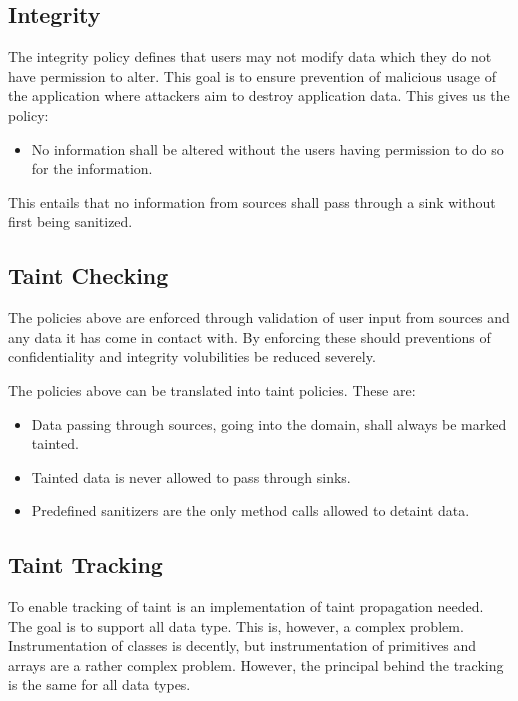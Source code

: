 \subsection{Integrity}
The integrity policy defines that users may not modify data which they do not have permission to alter. This goal is to ensure prevention of malicious usage of the application where attackers aim to destroy application data. This gives us the policy:

\hfill
\begin{itemize}
    \item No information shall be altered without the users having permission to do so for the information.
\end{itemize}
\hfill

This entails that no information from sources shall pass through a sink without first being sanitized.



\subsection{Taint Checking}
The policies above are enforced through validation of user input from sources and any data it has come in contact with. By enforcing these should preventions of confidentiality and integrity volubilities be reduced severely.

The policies above can be translated into taint policies. These are:

\hfill
\begin{itemize}
    \item Data passing through sources, going into the domain, shall always be marked tainted.
    \item Tainted data is never allowed to pass through sinks.
    \item Predefined sanitizers are the only method calls allowed to detaint data.
\end{itemize}
\hfill



\subsection{Taint Tracking}
To enable tracking of taint is an implementation of taint propagation needed. The goal is to support all data type. This is, however, a complex problem. Instrumentation of classes is decently, but instrumentation of primitives and arrays are a rather complex problem. However, the principal behind the tracking is the same for all data types. 

